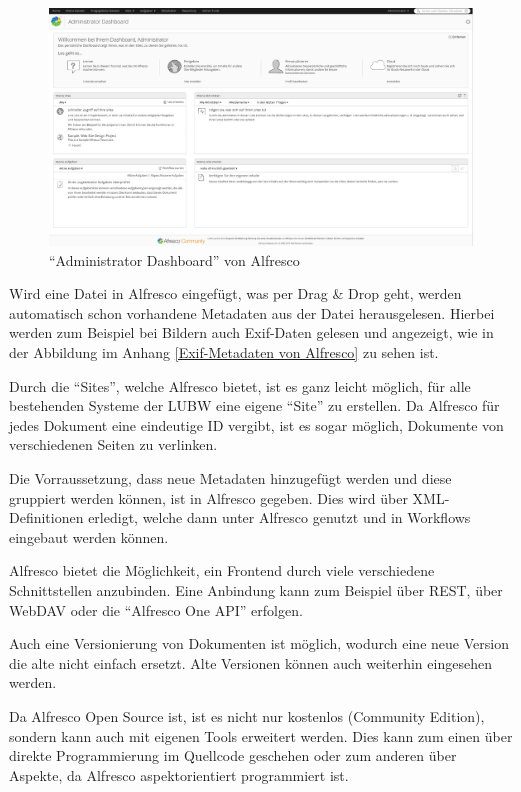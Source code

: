 \begin{figure}[!ht]
\centering
\includegraphics[width=16cm]{Bilder/Alfresco_Oberflaeche.jpg}
\caption{"`Administrator Dashboard"' von Alfresco}
\label{Alfresco Dashboard}
\centering
\end{figure}

Wird eine Datei in Alfresco eingef\"ugt, was per Drag \& Drop geht, werden automatisch schon vorhandene Metadaten aus der Datei herausgelesen. Hierbei werden zum Beispiel bei Bildern auch \ac{Exif}-Daten gelesen und angezeigt, wie in der Abbildung im Anhang \ref{Exif-Metadaten von Alfresco} zu sehen ist. 

Durch die "`Sites"', welche Alfresco bietet, ist es ganz leicht m\"oglich, f\"ur alle bestehenden Systeme der \ac{LUBW} eine eigene "`Site"' zu erstellen. Da Alfresco f\"ur jedes Dokument eine eindeutige ID vergibt, ist es sogar m\"oglich, Dokumente von verschiedenen Seiten zu verlinken.
\cite{Eval_DMS_Bachelor}

Die Vorraussetzung, dass neue Metadaten hinzugef\"ugt werden und diese gruppiert werden k\"onnen, ist in Alfresco gegeben. Dies wird \"uber XML-Definitionen erledigt, welche dann unter Alfresco genutzt und in Workflows eingebaut werden k\"onnen. \cite{Alfresco_Custom_Content_Types} \cite{Professional_Alfresco}

Alfresco bietet die M\"oglichkeit, ein Frontend durch viele verschiedene Schnittstellen anzubinden. Eine Anbindung kann zum Beispiel \"uber \ac{REST}, \"uber WebDAV oder die "`Alfresco One \ac{API}"' erfolgen. \cite{Alfrsco_Doku}

Auch eine Versionierung von Dokumenten ist m\"oglich, wodurch eine neue Version die alte nicht einfach ersetzt. Alte Versionen k\"onnen auch weiterhin eingesehen werden.

Da Alfresco Open Source ist, ist es nicht nur kostenlos (Community Edition), sondern kann auch mit eigenen Tools erweitert werden. Dies kann zum einen \"uber direkte Programmierung im Quellcode geschehen oder zum anderen \"uber Aspekte, da Alfresco aspektorientiert programmiert ist. \cite{Alfresco_und_Liferay}

